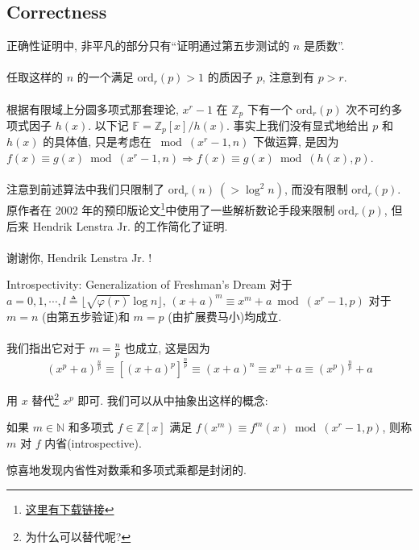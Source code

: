 \documentclass{beamer}
\def\ord{\textrm{ord}}
\begin{document}
\subsection{Correctness}
\begin{frame}
	正确性证明中, 非平凡的部分只有“证明通过第五步测试的 $n$ 是质数”. \\~\\

	任取这样的 $n$ 的一个满足 $\ord_r(p) > 1$ 的质因子 $p$, 注意到有 $p > r$.\\~\\

	根据有限域上分圆多项式那套理论, $x^r - 1$ 在 $\mathbb Z_p$ 下有一个 $\ord_r(p)$ 次不可约多项式因子 $h(x)$. 以下记 $\mathbb F = \mathbb Z_p[x] / h(x)$. 事实上我们没有显式地给出 $p$ 和 $h(x)$ 的具体值, 只是考虑在 $\bmod (x^r - 1, n)$ 下做运算, 是因为 $f(x) \equiv g(x) \bmod (x^r-1, n) \Rightarrow f(x) \equiv g(x) \bmod (h(x), p)$.\\~\\

	注意到前述算法中我们只限制了 $\ord_r(n) \ (> \log^2n)$, 而没有限制 $\ord_r(p)$. 原作者在 2002 年的预印版论文\footnote{\tiny \href{https://www.cse.iitk.ac.in/users/manindra/algebra/primality_original.pdf}{\color{red}这里有下载链接}}中使用了一些解析数论手段来限制 $\ord_r(p)$, 但后来 Hendrik Lenstra Jr. 的工作简化了证明.\\~\\

	{\kaishu 谢谢你, Hendrik Lenstra Jr. !}
\end{frame}
\begin{frame}{Introspectivity: Generalization of Freshman's Dream}
	对于 $a = 0, 1, \cdots, l \triangleq \lfloor \sqrt{\varphi(r)} \log n \rfloor$, $(x + a)^m \equiv x^m + a \bmod (x^r-1, p)$ 对于 $m = n$ (由第五步验证)和 $m = p$ (由扩展费马小)均成立.\\~\\
	
	我们指出它对于 $m = \frac np$ 也成立, 这是因为
	$$(x^p + a)^{\frac np} \equiv [(x + a)^p]^{\frac np} \equiv (x + a)^n \equiv x^n + a \equiv (x^p)^{\frac np} + a$$

	用 $x$ 替代\footnote{\tiny 为什么可以替代呢?} $x^p$ 即可. 我们可以从中抽象出这样的概念:

	\begin{definition}[内省]
		如果 $m \in \mathbb N$ 和多项式 $f \in \mathbb Z[x]$ 满足 $f(x^m) \equiv f^m(x) \bmod (x^r-1, p)$, 则称 $m$ 对 $f$ 内省(introspective).
	\end{definition}
	惊喜地发现内省性对数乘和多项式乘都是封闭的.
\end{frame}
\end{document}

